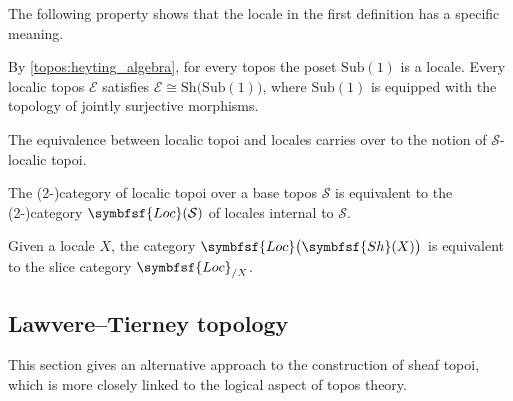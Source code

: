     The following property shows that the locale in the first definition has a specific meaning.
    \begin{property}
        By \cref{topos:heyting_algebra}, for every topos the poset $\mathrm{Sub}(1)$ is a locale. Every localic topos $\mathcal{E}$ satisfies $\mathcal{E}\cong\mathrm{Sh}\bigl(\mathrm{Sub}(1)\bigr)$, where $\mathrm{Sub}(1)$ is equipped with the topology of jointly surjective morphisms.
    \end{property}

    The equivalence between localic topoi and locales carries over to the notion of $\mathcal{S}$-localic topoi.
    \begin{property}
        The (2-)category of localic topoi over a base topos $\mathcal{S}$ is equivalent to the (2-)category $\symbfsf{Loc}(\mathcal{S})$ of locales internal to $\mathcal{S}$.
    \end{property}
    \begin{property}\label{topos:slice_locale}
        Given a locale $X$, the category $\symbfsf{Loc}\bigl(\symbfsf{Sh}(X)\bigr)$ is equivalent to the slice category $\symbfsf{Loc}_{/X}$.
    \end{property}

\subsection{Lawvere--Tierney topology}

    This section gives an alternative approach to the construction of sheaf topoi, which is more closely linked to the logical aspect of topos theory.

